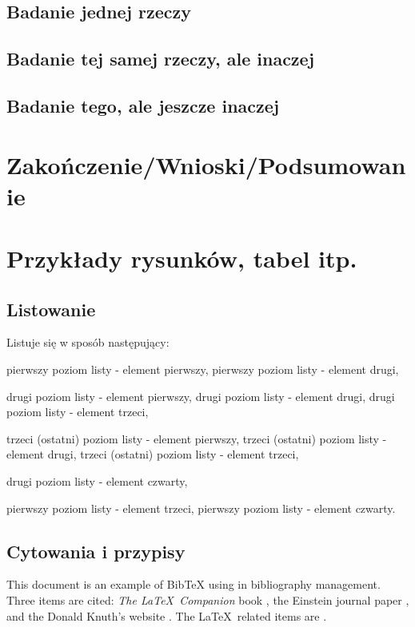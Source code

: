 \subsection{Badanie jednej rzeczy}
\lipsum[1-3]
\subsection{Badanie tej samej rzeczy, ale inaczej}
\lipsum[1-3]
\subsection{Badanie tego, ale jeszcze inaczej}
\lipsum[1-3]

\section[Zakończenie]{Zakończenie/Wnioski/Podsumowanie}
\lipsum[1-8]

\newpage
\section[Przykłady]{Przykłady rysunków, tabel itp.}
\subsection{Listowanie}
Listuje się w sposób następujący:
\begin{itemize}
	\itemi pierwszy poziom listy - element pierwszy,
	\itemi pierwszy poziom listy - element drugi,
	\begin{itemize}
		\itemii drugi poziom listy - element pierwszy,
		\itemii drugi poziom listy - element drugi,
		\itemii drugi poziom listy - element trzeci,
		\begin{itemize}
			\itemiii trzeci (ostatni) poziom listy - element pierwszy,
			\itemiii trzeci (ostatni) poziom listy - element drugi,
			\itemiii trzeci (ostatni) poziom listy - element trzeci,
		\end{itemize}
		\itemii drugi poziom listy - element czwarty,
		\end{itemize}
	\itemi pierwszy poziom listy - element trzeci,
	\itemi pierwszy poziom listy - element czwarty.
\end{itemize}

\subsection{Cytowania i przypisy}
This document is an example of BibTeX using in bibliography management. Three items 
are cited: \textit{The \LaTeX\ Companion} book \cite{latexcompanion}, the Einstein
journal paper \cite{einstein}, and the Donald Knuth's website \cite{knuthwebsite}. 
The \LaTeX\ related items are \cite{latexcompanion,knuthwebsite}.\footnotemark[1]

